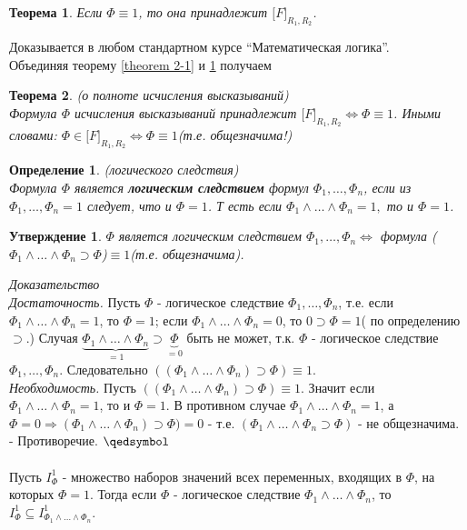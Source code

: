 \documentclass{article}
\newtheorem{theorem}{Теорема}
\newtheorem{definition}{Определение}
\newtheorem{proposition}{Утверждение}
\numberwithin{example}{section}
\numberwithin{question}{section}
\numberwithin{Remark}{section}
\numberwithin{theorem}{section}
\numberwithin{definition}{section}
\numberwithin{proposition}{section}
\begin{document}
\begin{theorem}
	\label{theorem 2-2}
	Если $\Phi\equiv 1$, то она принадлежит $\big[F\big]_{R_1,R_2}$.
\end{theorem}
Доказывается в любом стандартном курсе ``Математическая логика''.\\
Объединяя теорему \ref{theorem 2-1} и \ref{theorem 2-2} получаем
\begin{theorem}
	(о полноте исчисления высказываний)\\
	Формула $\Phi$ исчисления высказываний принадлежит $\big[F\big]_{R_1,R_2}\Leftrightarrow \Phi \equiv 1$. Иными словами: $\Phi\in \big[F\big]_{R_1,R_2}\Leftrightarrow \Phi \equiv 1$(т.е. общезначима!)
\end{theorem}
\begin{definition}
	(логического следствия)\\
	Формула $\Phi$ является \textbf{логическим следствием} формул $\Phi_1,\ldots,\Phi_n$, если из $\Phi_1,\ldots,\Phi_n=1$ следует, что и $\Phi=1$. Т есть если $\Phi_1\wedge\ldots\wedge \Phi_n=1,$ то и $\Phi=1$.
\end{definition}
\begin{proposition}
	$\Phi$ является логическим следствием $\Phi_1,\ldots,\Phi_n\Leftrightarrow$ формула ($\Phi_1\wedge\ldots\wedge \Phi_n\supset \Phi$)$\equiv 1$(т.е. общезначима).
\end{proposition}
\emph{Доказательство}\\
\emph{Достаточность.} Пусть $\Phi$ - логическое следствие $\Phi_1,\ldots,\Phi_n$, т.е. если $\Phi_1\wedge\ldots\wedge \Phi_n=1$, то $\Phi=1$; если $\Phi_1\wedge\ldots\wedge \Phi_n=0$, то $0\supset \Phi=1$( по определению $\supset$.) Случая $\underbrace{\Phi_1\wedge\ldots\wedge \Phi_n}_{=1}\supset\underbrace{\Phi}_{=0}$ быть не может, т.к. $\Phi$ - логическое следствие $\Phi_1,\ldots,\Phi_n$. Следовательно $((\Phi_1\wedge\ldots\wedge \Phi_n)\supset \Phi)\equiv 1$.\\
\emph{Необходимость.} Пусть $((\Phi_1\wedge\ldots\wedge \Phi_n)\supset \Phi)\equiv 1$. Значит если $\Phi_1\wedge\ldots\wedge \Phi_n=1$, то и $\Phi=1$. В противном случае $\Phi_1\wedge\ldots\wedge \Phi_n=1$, а $\Phi=0\Rightarrow (\Phi_1\wedge\ldots\wedge \Phi_n)\supset \Phi)=0$ - т.е. $(\Phi_1\wedge\ldots\wedge \Phi_n\supset \Phi)$ - не общезначима. - Противоречие. \hfill $\qedsymbol$ \\
\\
Пусть $I^1_{\Phi}$ - множество наборов значений всех переменных, входящих в $\Phi$, на которых $\Phi=1$. Тогда если $\Phi$ - логическое следствие $\Phi_1\wedge\ldots\wedge \Phi_n$, то $I^1_{\Phi}\subseteq I^1_{\Phi_1\wedge\ldots\wedge\Phi_n}$.
\end{document}
